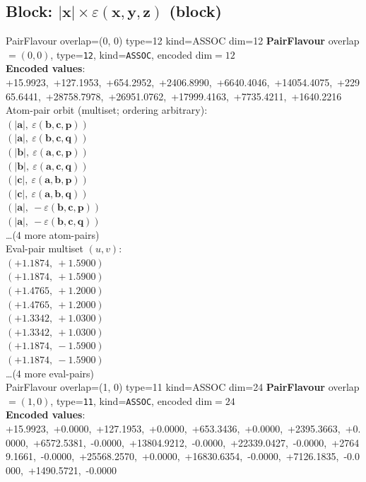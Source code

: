 \documentclass[a4paper,11pt]{article}
\newcommand{\vc}[1]{\ensuremath{\mathbf{#1}}}
\newcommand{\dnfagmiihhiejm}[1]{|\vc{#1}|}
\newcommand{\kblbmcpggoncpf}[3]{\varepsilon(\mathbf{#1},\mathbf{#2},\mathbf{#3})}
\begin{document}
\subsection{Block: $\dnfagmiihhiejm{x} \times \kblbmcpggoncpf{x}{y}{z}$  (block)}
    PairFlavour  overlap=(0, 0)  type=12  kind=ASSOC  dim=12
\textbf{PairFlavour} overlap$=(0, 0)$, type=\texttt{12}, kind=\texttt{ASSOC}, encoded dim$=12$\\
\textbf{      Encoded values}: +15.9923,\ +127.1953,\ +654.2952,\ +2406.8990,\ +6640.4046,\ +14054.4075,\ +22965.6441,\ +28758.7978,\ +26951.0762,\ +17999.4163,\ +7735.4211,\ +1640.2216\\
\quad Atom-pair orbit (multiset; ordering arbitrary):\\
$(\dnfagmiihhiejm{a},\ \kblbmcpggoncpf{b}{c}{p})$\\
$(\dnfagmiihhiejm{a},\ \kblbmcpggoncpf{b}{c}{q})$\\
$(\dnfagmiihhiejm{b},\ \kblbmcpggoncpf{a}{c}{p})$\\
$(\dnfagmiihhiejm{b},\ \kblbmcpggoncpf{a}{c}{q})$\\
$(\dnfagmiihhiejm{c},\ \kblbmcpggoncpf{a}{b}{p})$\\
$(\dnfagmiihhiejm{c},\ \kblbmcpggoncpf{a}{b}{q})$\\
$(\dnfagmiihhiejm{a},\ -\kblbmcpggoncpf{b}{c}{p})$\\
$(\dnfagmiihhiejm{a},\ -\kblbmcpggoncpf{b}{c}{q})$\\
\quad \ldots (4 more atom-pairs)\\
\quad Eval-pair multiset $(u, v)$:\\
$(+1.1874,\ +1.5900)$\\
$(+1.1874,\ +1.5900)$\\
$(+1.4765,\ +1.2000)$\\
$(+1.4765,\ +1.2000)$\\
$(+1.3342,\ +1.0300)$\\
$(+1.3342,\ +1.0300)$\\
$(+1.1874,\ -1.5900)$\\
$(+1.1874,\ -1.5900)$\\
\quad \ldots (4 more eval-pairs)\\
    PairFlavour  overlap=(1, 0)  type=11  kind=ASSOC  dim=24
\textbf{PairFlavour} overlap$=(1, 0)$, type=\texttt{11}, kind=\texttt{ASSOC}, encoded dim$=24$\\
\textbf{      Encoded values}: +15.9923,\ +0.0000,\ +127.1953,\ +0.0000,\ +653.3436,\ +0.0000,\ +2395.3663,\ +0.0000,\ +6572.5381,\ -0.0000,\ +13804.9212,\ -0.0000,\ +22339.0427,\ -0.0000,\ +27649.1661,\ -0.0000,\ +25568.2570,\ +0.0000,\ +16830.6354,\ -0.0000,\ +7126.1835,\ -0.0000,\ +1490.5721,\ -0.0000\\
\end{document}
